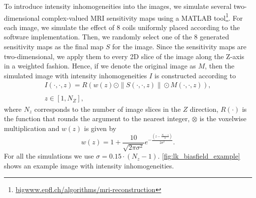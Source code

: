 To introduce intensity inhomogeneities into the images, we simulate several two-
dimensional complex-valued MRI sensitivity maps using a MATLAB
tool\footnote{\url{bigwww.epfl.ch/algorithms/mri-reconstruction}}. For each
image, we simulate the effect of 8 coils uniformly placed according to the
software implementation. Then, we randomly select one of the 8 generated
sensitivity maps as the final map $S$ for the image. Since the sensitivity maps
are two-dimensional, we apply them to every 2D slice of the image along the
Z-axis in a weighted fashion. Hence, if we denote the original image as $M$,
then the simulated image with intensity inhomogeneities $I$ is constructed
according to
\begin{equation*}
    \begin{array}{c}
        I(\cdot,\cdot,z) = R\left(w(z) \odot \|S(\cdot,\cdot,z)\| \odot M(\cdot,\cdot,z)\right), \\ \\ z \in [1, N_{Z}],
    \end{array}
\end{equation*}
where $N_{z}$ corresponds to the number of image slices in the $Z$ direction,
$R(\cdot)$ is the function that rounds the argument to the nearest integer,
$\otimes$ is the voxelwise multiplication and $w(z)$ is given by
\begin{equation*}
    w(z) = 1 + \frac{10}{\sqrt{2\pi\sigma^{2}}}e^{-\frac{\left(z - \frac{N_{z}-1}{2}\right)}{2\sigma^{2}}}.
\end{equation*}
For all the simulations we use $\sigma = 0.15 \cdot (N_{z} - 1)$.
\cref{fig:lk_biasfield_example} shows an example image with intensity
inhomogeneities.
